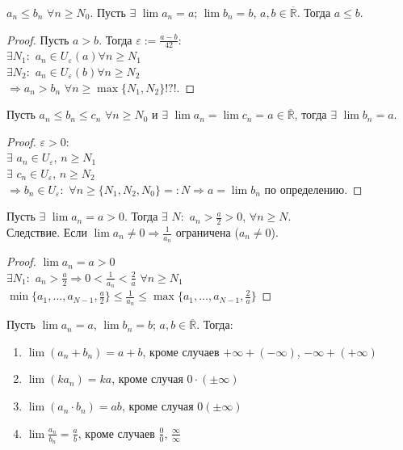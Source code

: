 \documentclass[12pt]{article}
\begin{document}
	\begin{lemma}
		$a_n \leqslant b_n$ $\forall n \geqslant N_{0}$. Пусть $\exists$ $\lim a_n = a$; $\lim b_n = b$, $a, b \in \overline{\mathbb{R}}$. Тогда $a \leqslant b$.
	\end{lemma}
	\begin{proof}
		Пусть $a > b$. Тогда $\varepsilon := \frac{a - b}{42}:$ \\
		$\exists N_1:$ $a_n \in U_{\varepsilon} (a) \forall n \geqslant N_1$ \\
		$\exists N_2:$ $a_n \in U_{\varepsilon} (b) \forall n \geqslant N_2$ \\
		$\Rightarrow a_n > b_n$ $\forall n \geqslant \max\{N_1, N_2\} !?!$.
	\end{proof}
	\begin{lemma}
		Пусть $a_n \leqslant b_n \leqslant c_n$ $\forall n \geqslant N_0$ и $\exists$ $\lim a_n = \lim c_n = a \in \overline{\mathbb{R}}$, тогда $\exists$ $\lim b_n = a$.
	\end{lemma}
	\begin{proof}
		$\varepsilon > 0:$ \\
		$\exists$ $a_n \in U_{\varepsilon}$, $n \geqslant N_1$ \\
		$\exists$ $c_n \in U_{\varepsilon}$, $n \geqslant N_2$ \\
		$\Rightarrow b_n \in U_{\varepsilon}:$ $\forall n \geqslant \{N_1, N_2, N_0\} =: N \Rightarrow a = \lim b_n$ по определению.
	\end{proof}
	\begin{lemma}
		Пусть $\exists$ $\lim a_n = a > 0$. Тогда $\exists$ $N:$ $a_n > \frac{a}{2} > 0$, $\forall n \geqslant N$. \\
		Следствие. Если $\lim a_n \not= 0 \Rightarrow \frac{1}{a_n}$ ограничена ($a_n \not= 0$).
	\end{lemma}
	\begin{proof}
		$\lim a_n = a > 0$ \\
		$\exists N_1:$ $a_n > \frac{a}{2} \Rightarrow 0 < \frac{1}{a_n} < \frac{2}{a}$ $\forall n \geqslant N_1$ \\
		$\min\{a_1, \dots, a_{N - 1}, \frac{a}{2}\} \leqslant \frac{1}{a_n} \leqslant \max\{a_1, \dots, a_{N - 1}, \frac{2}{a}\}$
	\end{proof}
	\begin{theorem}
		Пусть $\lim a_n = a$, $\lim b_n = b$; $a, b \in \overline{\mathbb{R}}$. Тогда:
		\begin{enumerate}
			\item $\lim (a_n + b_n) = a + b$, кроме случаев $+ \infty + (- \infty)$, $- \infty + (+ \infty)$
			\item $\lim (ka_n) = ka$, кроме случая $0 \cdot (\pm \infty)$
			\item $\lim (a_n \cdot b_n) = ab$, кроме случая $0 (\pm \infty)$
			\item $\lim \frac{a_n}{b_n} = \frac{a}{b}$, кроме случаев $\frac{0}{0}$, $\frac{\infty}{\infty}$
		\end{enumerate}
	\end{theorem}
\end{document}
